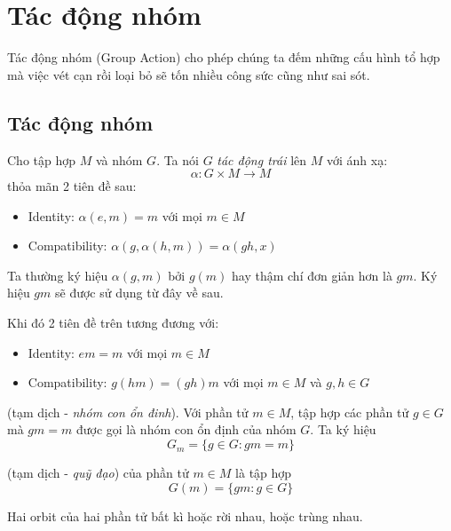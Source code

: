 \chapter{Tác động nhóm}

Tác động nhóm (Group Action) cho phép chúng ta đếm những cấu hình tổ hợp mà việc vét cạn rồi loại bỏ sẽ tốn nhiều công sức cũng như sai sót.

\section{Tác động nhóm}

Cho tập hợp $M$ và nhóm $G$. Ta nói $G$ \textit{tác động trái} lên $M$ với ánh xạ:
\[\alpha: G \times M \rightarrow M\]
thỏa mãn 2 tiên đề sau:

\begin{itemize}[noitemsep]
    \item Identity: $\alpha (e, m) = m$ với mọi $m \in M$
    \item Compatibility: $\alpha (g, \alpha (h, m)) = \alpha (g h, x)$
\end{itemize}

Ta thường ký hiệu $\alpha (g, m)$ bởi $g(m)$ hay thậm chí đơn giản hơn là $gm$. Ký hiệu $gm$ sẽ được sử dụng từ đây về sau.

Khi đó 2 tiên đề trên tương đương với:

\begin{itemize}[noitemsep]
    \item Identity: $e m = m$ với mọi $m \in M$
    \item Compatibility: $g(hm) = (gh)m$ với mọi $m \in M$ và $g, h \in G$
\end{itemize}

\begin{definition}[Stabilizer]
    (tạm dịch - \textit{nhóm con ổn đinh}). Với phần tử $m \in M$, tập hợp các phần tử $g \in G$ mà $gm = m$ được gọi là nhóm con ổn định của nhóm $G$. Ta ký hiệu
    \[G_m = \{ g \in G : gm = m \}\]
\end{definition}

\begin{definition}[Orbit]
    (tạm dịch - \textit{quỹ đạo}) của phần tử $m \in M$ là tập hợp
    \[G(m) = \{gm : g \in G\}\]
\end{definition}

\begin{remark}
    Hai orbit của hai phần tử bất kì hoặc rời nhau, hoặc trùng nhau.
\end{remark}

